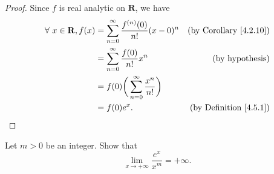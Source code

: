 \begin{proof}
    Since \(f\) is real analytic on \(\mathbf{R}\), we have
    \begin{align*}
        \forall\ x \in \mathbf{R}, f(x) & = \sum_{n = 0}^\infty \frac{f^{(n)}(0)}{n!} (x - 0)^n & \text{(by Corollary \ref{4.2.10})} \\
                                        & = \sum_{n = 0}^\infty \frac{f(0)}{n!} x^n             & \text{(by hypothesis)}             \\
                                        & = f(0) \bigg(\sum_{n = 0}^\infty \frac{x^n}{n!}\bigg)                                      \\
                                        & = f(0) e^x.                                           & \text{(by Definition \ref{4.5.1})}
    \end{align*}
\end{proof}

\begin{exercise}\label{ex 4.5.8}
    Let \(m > 0\) be an integer.
    Show that
    \[
        \lim_{x \to +\infty} \frac{e^x}{x^m} = +\infty.
    \]
\end{exercise}

